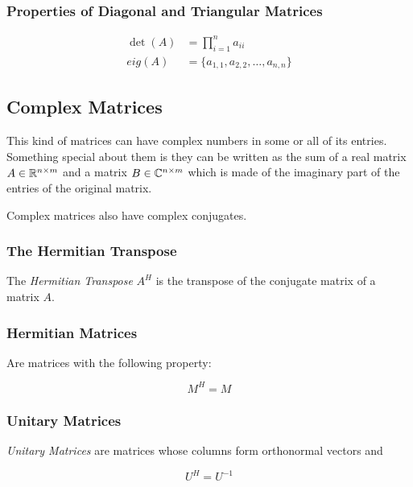 \subsubsection{Properties of Diagonal and Triangular Matrices}

\begin{align*}
    \det(A) &= \prod_{i = 1}^{n} a_{ii} \\
    eig(A) &= \{a_{1,1}, a_{2,2}, \dots, a_{n,n}\}
\end{align*}

\subsection{Complex Matrices}

This kind of matrices can have complex numbers in some or all of its entries. Something 
special about them is they can be written as the sum of a real matrix \(A \in \mathbb{R}^{n \times m}\) and 
a matrix \(B \in \mathbb{C}^{n \times m}\) which is made of the imaginary part of the entries of the original 
matrix.

Complex matrices also have complex conjugates.


\subsubsection{The Hermitian Transpose}

The \emph{Hermitian Transpose} \(A^H\) is the transpose of the conjugate matrix of a matrix \(A\).

\subsubsection{Hermitian Matrices}

Are matrices with the following property:

\[
    M^H = M
\]

\subsubsection{Unitary Matrices}

\emph{Unitary Matrices} are matrices whose columns form orthonormal vectors and 

\[
    U^H = U^{-1}
\]